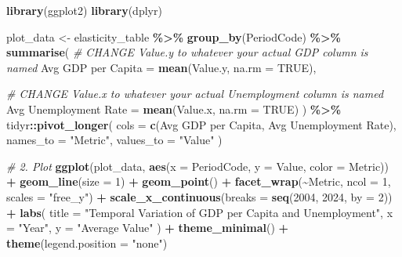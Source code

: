 \documentclass[
]{article}
\newenvironment{Shaded}{\begin{snugshade}}{\end{snugshade}}
\newcommand{\AttributeTok}[1]{\textcolor[rgb]{0.13,0.29,0.53}{#1}}
\newcommand{\CommentTok}[1]{\textcolor[rgb]{0.56,0.35,0.01}{\textit{#1}}}
\newcommand{\ConstantTok}[1]{\textcolor[rgb]{0.56,0.35,0.01}{#1}}
\newcommand{\DecValTok}[1]{\textcolor[rgb]{0.00,0.00,0.81}{#1}}
\newcommand{\FunctionTok}[1]{\textcolor[rgb]{0.13,0.29,0.53}{\textbf{#1}}}
\newcommand{\NormalTok}[1]{#1}
\newcommand{\OtherTok}[1]{\textcolor[rgb]{0.56,0.35,0.01}{#1}}
\newcommand{\SpecialCharTok}[1]{\textcolor[rgb]{0.81,0.36,0.00}{\textbf{#1}}}
\newcommand{\StringTok}[1]{\textcolor[rgb]{0.31,0.60,0.02}{#1}}
\begin{document}
\begin{Shaded}
\begin{Highlighting}[]
\FunctionTok{library}\NormalTok{(ggplot2)}
\FunctionTok{library}\NormalTok{(dplyr)}

\NormalTok{plot\_data }\OtherTok{\textless{}{-}}\NormalTok{ elasticity\_table }\SpecialCharTok{\%\textgreater{}\%}
  \FunctionTok{group\_by}\NormalTok{(PeriodCode) }\SpecialCharTok{\%\textgreater{}\%}
  \FunctionTok{summarise}\NormalTok{(}
    \CommentTok{\# CHANGE \textquotesingle{}Value.y\textquotesingle{} to whatever your actual GDP column is named}
    \StringTok{\textasciigrave{}}\AttributeTok{Avg GDP per Capita}\StringTok{\textasciigrave{}} \OtherTok{=} \FunctionTok{mean}\NormalTok{(Value.y, }\AttributeTok{na.rm =} \ConstantTok{TRUE}\NormalTok{), }
    
    \CommentTok{\# CHANGE \textquotesingle{}Value.x\textquotesingle{} to whatever your actual Unemployment column is named}
    \StringTok{\textasciigrave{}}\AttributeTok{Avg Unemployment Rate}\StringTok{\textasciigrave{}} \OtherTok{=} \FunctionTok{mean}\NormalTok{(Value.x, }\AttributeTok{na.rm =} \ConstantTok{TRUE}\NormalTok{)}
\NormalTok{  ) }\SpecialCharTok{\%\textgreater{}\%}
\NormalTok{  tidyr}\SpecialCharTok{::}\FunctionTok{pivot\_longer}\NormalTok{(}
    \AttributeTok{cols =} \FunctionTok{c}\NormalTok{(}\StringTok{\textasciigrave{}}\AttributeTok{Avg GDP per Capita}\StringTok{\textasciigrave{}}\NormalTok{, }\StringTok{\textasciigrave{}}\AttributeTok{Avg Unemployment Rate}\StringTok{\textasciigrave{}}\NormalTok{), }
    \AttributeTok{names\_to =} \StringTok{"Metric"}\NormalTok{, }
    \AttributeTok{values\_to =} \StringTok{"Value"}
\NormalTok{  )}

\CommentTok{\# 2. Plot}
\FunctionTok{ggplot}\NormalTok{(plot\_data, }\FunctionTok{aes}\NormalTok{(}\AttributeTok{x =}\NormalTok{ PeriodCode, }\AttributeTok{y =}\NormalTok{ Value, }\AttributeTok{color =}\NormalTok{ Metric)) }\SpecialCharTok{+}
  \FunctionTok{geom\_line}\NormalTok{(}\AttributeTok{size =} \DecValTok{1}\NormalTok{) }\SpecialCharTok{+}
  \FunctionTok{geom\_point}\NormalTok{() }\SpecialCharTok{+}
  \FunctionTok{facet\_wrap}\NormalTok{(}\SpecialCharTok{\textasciitilde{}}\NormalTok{Metric, }\AttributeTok{ncol =} \DecValTok{1}\NormalTok{, }\AttributeTok{scales =} \StringTok{"free\_y"}\NormalTok{) }\SpecialCharTok{+} 
  \FunctionTok{scale\_x\_continuous}\NormalTok{(}\AttributeTok{breaks =} \FunctionTok{seq}\NormalTok{(}\DecValTok{2004}\NormalTok{, }\DecValTok{2024}\NormalTok{, }\AttributeTok{by =} \DecValTok{2}\NormalTok{)) }\SpecialCharTok{+} 
  \FunctionTok{labs}\NormalTok{(}
    \AttributeTok{title =} \StringTok{"Temporal Variation of GDP per Capita and Unemployment"}\NormalTok{,}
    \AttributeTok{x =} \StringTok{"Year"}\NormalTok{,}
    \AttributeTok{y =} \StringTok{"Average Value"}
\NormalTok{  ) }\SpecialCharTok{+}
  \FunctionTok{theme\_minimal}\NormalTok{() }\SpecialCharTok{+}
  \FunctionTok{theme}\NormalTok{(}\AttributeTok{legend.position =} \StringTok{"none"}\NormalTok{)}
\end{Highlighting}
\end{Shaded}
\end{document}

